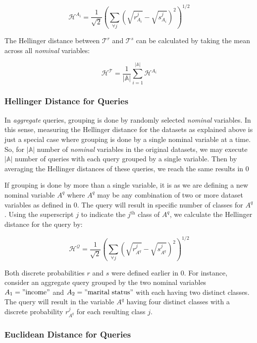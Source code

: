 \[\mathcal{H}^{A_{i}} = \frac{1}{\sqrt{2}}\left( \sum_{\forall j}^{}\left( \sqrt{r_{A_{i}}^{j}} - \sqrt{s_{A_{i}}^{j}} \right)^{2} \right)^{1/2}\]

The Hellinger distance between \(\mathcal{T}^{r}\) and
\(\mathcal{T}^{s}\) can be calculated by taking the mean across all
\emph{nominal} variables:

\[\mathcal{H}^{\mathcal{T}} = \frac{1}{|\mathbb{A}|}\sum_{i = 1}^{|\mathbb{A}|}\mathcal{H}^{A_{i}}\]

\hypertarget{hellinger-distance-for-queries}{%
\subsubsection{Hellinger Distance for
Queries}\label{hellinger-distance-for-queries}}

In \emph{aggregate} queries, grouping is done by randomly selected
\emph{nominal} variables. In this sense, measuring the Hellinger
distance for the datasets as explained above is just a special case
where grouping is done by a single nominal variable at a time. So, for
\(|\mathbb{A}|\) number of \emph{nominal} variables in the original
datasets, we may execute \(|\mathbb{A}|\) number of queries with each
query grouped by a single variable. Then by averaging the Hellinger
distances of these queries, we reach the same results in 0

If grouping is done by more than a single variable, it is as we are
defining a new nominal variable \(A^{q}\) where \(A^{q}\) may be any
combination of two or more dataset variables as defined in 0. The query
will result in specific number of classes for \(A^{q}\). Using the
superscript \(j\) to indicate the \(j^{\text{th}}\) class of \(A^{q}\),
we calculate the Hellinger distance for the query by:

\[\mathcal{H}^{\mathcal{Q}} = \frac{1}{\sqrt{2}}\left( \sum_{\forall j}^{}\left( \sqrt{r_{A^{q}}^{j}} - \sqrt{s_{A^{q}}^{j}} \right)^{2} \right)^{1/2}\]

Both discrete probabilities \(r\) and \(s\) were defined earlier in 0.
For instance, consider an aggregate query grouped by the two nominal
variables \(A_{1} = \mathrm{"income"}\) and
\(A_{2} = \mathrm{"mar}\mathrm{\text{ital}}\mathrm{\ status"}\) with
each having two distinct classes. The query will result in the variable
\(A^{q}\) having four distinct classes with a discrete probability
\(r_{A^{q}}^{j}\) for each resulting class \(j\).

\hypertarget{euclidean-distance-for-queries}{%
\subsubsection{Euclidean Distance for
Queries}\label{euclidean-distance-for-queries}}

